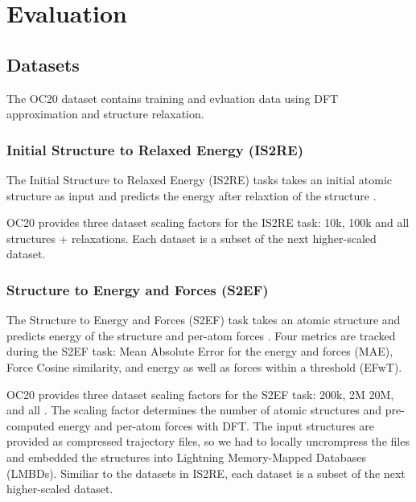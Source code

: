 \section{Evaluation}
\label{section:evaluation}

\subsection{Datasets}

The OC20 dataset contains training and evluation data using DFT approximation and 
structure relaxation. 

\subsubsection{Initial Structure to Relaxed Energy (IS2RE)}

The Initial Structure to Relaxed Energy (IS2RE) tasks takes an initial atomic 
structure as input and predicts the energy after relaxtion of the structure 
\cite*{Chanussot_2021, https://doi.org/10.48550/arxiv.2206.08917}. 


OC20 provides three dataset scaling factors for the IS2RE task: 10k, 100k and 
all structures + relaxations. Each dataset is a subset of the next higher-scaled 
dataset.

\subsubsection{Structure to Energy and Forces (S2EF)}

The Structure to Energy and Forces (S2EF) task takes an atomic structure and 
predicts energy of the structure and per-atom forces 
\cite*{Chanussot_2021, https://doi.org/10.48550/arxiv.2206.08917}. Four metrics 
are tracked during the S2EF task: Mean Absolute Error for the energy and forces 
(MAE), Force Cosine similarity, and energy as well as forces within a threshold 
(EFwT). 

OC20 provides three dataset scaling factors for the S2EF task: 200k, 2M 20M,  
and all . The scaling factor determines the number of atomic structures and 
pre-computed energy and per-atom forces with DFT. The input structures are 
provided as compressed trajectory files, so we had to locally uncrompress the 
files and embedded the structures into Lightning Memory-Mapped Databases (LMBDs). 
Similiar to the datasets in IS2RE, each dataset is a subset of the next 
higher-scaled dataset. 